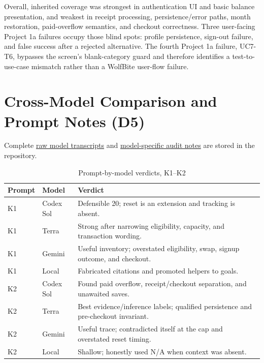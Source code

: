 \documentclass[sigconf]{acmart}
\begin{document}
Overall, inherited coverage was strongest in authentication UI and basic
balance presentation, and weakest in receipt processing, persistence/error
paths, month restoration, paid-overflow semantics, and checkout correctness.
Three user-facing Project 1a failures occupy those blind spots: profile
persistence, sign-out failure, and false success after a rejected alternative.
The fourth Project 1a failure, UC7-T6, bypasses the screen's blank-category
guard and therefore identifies a test-to-use-case mismatch rather than a
WolfBite user-flow failure.

\section{Cross-Model Comparison and Prompt Notes (D5)}

Complete
\href{https://github.com/closeabigaile/SEf26_project/tree/main/Project1a_Work/model_outputs}{raw model transcripts}
and
\href{https://github.com/closeabigaile/SEf26_project/tree/main/Project1a_Work/prompt_notes}{model-specific audit notes}
are stored in the repository.

\begin{table}[H]
  \caption{Prompt-by-model verdicts, K1--K2}
  \label{tab:model-comparison}
  \centering
  \scriptsize
  \begin{tabular}{@{}L{0.08\columnwidth}L{0.20\columnwidth}L{0.62\columnwidth}@{}}
    \toprule
    Prompt & Model & Verdict \\
    \midrule
    K1 & Codex Sol & Defensible 20; reset is an extension and tracking is absent. \\
    K1 & Terra & Strong after narrowing eligibility, capacity, and transaction wording. \\
    K1 & Gemini & Useful inventory; overstated eligibility, swap, signup outcome, and checkout. \\
    K1 & Local & Fabricated citations and promoted helpers to goals. \\
    K2 & Codex Sol & Found paid overflow, receipt/checkout separation, and unawaited saves. \\
    K2 & Terra & Best evidence/inference labels; qualified persistence and pre-checkout invariant. \\
    K2 & Gemini & Useful trace; contradicted itself at the cap and overstated reset timing. \\
    K2 & Local & Shallow; honestly used N/A when context was absent. \\
    \bottomrule
  \end{tabular}
\end{table}
\end{document}
